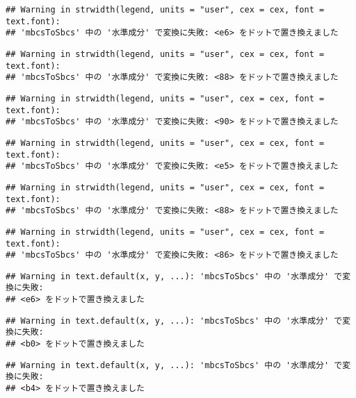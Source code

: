 \documentclass[]{article}
\begin{document}
\begin{verbatim}
## Warning in strwidth(legend, units = "user", cex = cex, font = text.font):
## 'mbcsToSbcs' 中の '水準成分' で変換に失敗: <e6> をドットで置き換えました
\end{verbatim}

\begin{verbatim}
## Warning in strwidth(legend, units = "user", cex = cex, font = text.font):
## 'mbcsToSbcs' 中の '水準成分' で変換に失敗: <88> をドットで置き換えました
\end{verbatim}

\begin{verbatim}
## Warning in strwidth(legend, units = "user", cex = cex, font = text.font):
## 'mbcsToSbcs' 中の '水準成分' で変換に失敗: <90> をドットで置き換えました
\end{verbatim}

\begin{verbatim}
## Warning in strwidth(legend, units = "user", cex = cex, font = text.font):
## 'mbcsToSbcs' 中の '水準成分' で変換に失敗: <e5> をドットで置き換えました
\end{verbatim}

\begin{verbatim}
## Warning in strwidth(legend, units = "user", cex = cex, font = text.font):
## 'mbcsToSbcs' 中の '水準成分' で変換に失敗: <88> をドットで置き換えました
\end{verbatim}

\begin{verbatim}
## Warning in strwidth(legend, units = "user", cex = cex, font = text.font):
## 'mbcsToSbcs' 中の '水準成分' で変換に失敗: <86> をドットで置き換えました
\end{verbatim}

\begin{verbatim}
## Warning in text.default(x, y, ...): 'mbcsToSbcs' 中の '水準成分' で変換に失敗:
## <e6> をドットで置き換えました
\end{verbatim}

\begin{verbatim}
## Warning in text.default(x, y, ...): 'mbcsToSbcs' 中の '水準成分' で変換に失敗:
## <b0> をドットで置き換えました
\end{verbatim}

\begin{verbatim}
## Warning in text.default(x, y, ...): 'mbcsToSbcs' 中の '水準成分' で変換に失敗:
## <b4> をドットで置き換えました
\end{verbatim}
\end{document}
